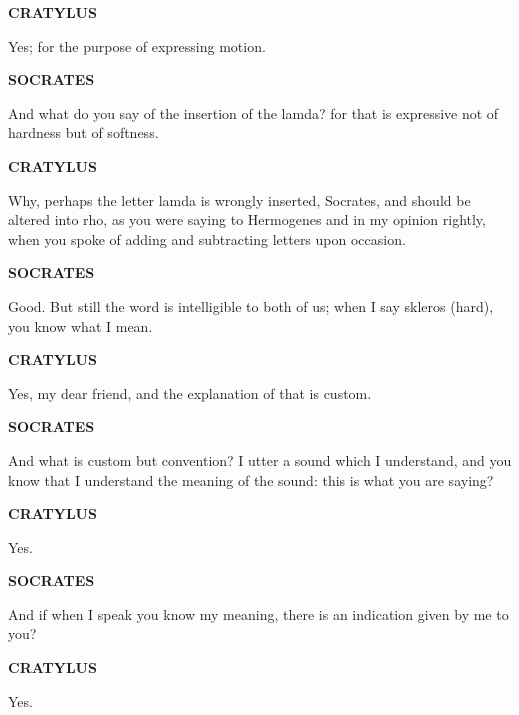 \documentclass[11pt,letter]{article}
\begin{document}
\par \textbf{CRATYLUS}
\par   Yes; for the purpose of expressing motion.

\par \textbf{SOCRATES}
\par   And what do you say of the insertion of the lamda? for that is expressive not of hardness but of softness.

\par \textbf{CRATYLUS}
\par   Why, perhaps the letter lamda is wrongly inserted, Socrates, and should be altered into rho, as you were saying to Hermogenes and in my opinion rightly, when you spoke of adding and subtracting letters upon occasion.

\par \textbf{SOCRATES}
\par   Good. But still the word is intelligible to both of us; when I say skleros (hard), you know what I mean.

\par \textbf{CRATYLUS}
\par   Yes, my dear friend, and the explanation of that is custom.

\par \textbf{SOCRATES}
\par   And what is custom but convention? I utter a sound which I understand, and you know that I understand the meaning of the sound:  this is what you are saying?

\par \textbf{CRATYLUS}
\par   Yes.

\par \textbf{SOCRATES}
\par   And if when I speak you know my meaning, there is an indication given by me to you?

\par \textbf{CRATYLUS}
\par   Yes.
\end{document}

